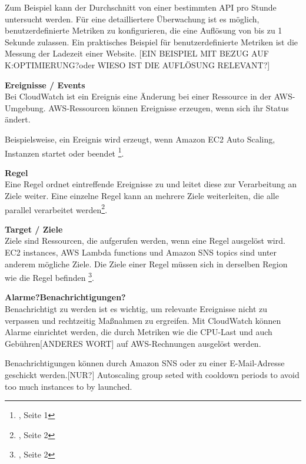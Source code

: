 Zum Beispiel kann der Durchschnitt von einer bestimmten API pro Stunde untersucht werden.
Für eine detailliertere Überwachung ist es möglich, benutzerdefinierte Metriken zu konfigurieren, die eine Auflösung von bis zu 1 Sekunde zulassen. Ein praktisches Beispiel für benutzerdefinierte Metriken ist die Messung der Ladezeit einer Website.
      [EIN BEISPIEL MIT BEZUG AUF K:OPTIMIERUNG?oder WIESO IST DIE AUFLÖSUNG RELEVANT?]

\textbf{Ereignisse / Events} \\
Bei CloudWatch ist ein Ereignis eine Änderung bei einer Ressource in der AWS-Umgebung.
AWS-Ressourcen können Ereignisse erzeugen, wenn sich ihr Status ändert.

Beispielsweise, ein Ereignis wird erzeugt, wenn Amazon EC2 Auto Scaling, Instanzen startet oder beendet \footnote{\cite{AMZ13}, Seite 1}.

\textbf{Regel} \\
Eine Regel ordnet eintreffende Ereignisse zu und leitet diese zur Verarbeitung an Ziele weiter.
Eine einzelne Regel kann an mehrere Ziele weiterleiten, die alle parallel verarbeitet werden\footnote{\cite{AMZ13}, Seite 2}.

\textbf{Target / Ziele} \\
Ziele sind Ressourcen, die aufgerufen werden, wenn eine Regel ausgelöst wird.
EC2 instances, AWS Lambda functions und Amazon SNS topics sind unter anderem mögliche Ziele.
Die Ziele einer Regel müssen sich in derselben Region wie die Regel befinden
\footnote{\cite{AMZ13}, Seite 2}.

\textbf{Alarme?Benachrichtigungen?}\\
Benachrichtigt zu werden ist es wichtig, um relevante Ereignisse nicht zu verpassen und rechtzeitig Maßnahmen zu ergreifen. Mit CloudWatch können Alarme einrichtet werden, die durch Metriken wie die CPU-Last und auch Gebühren[ANDERES WORT] auf AWS-Rechnungen ausgelöst werden.

Benachrichtigungen können durch Amazon SNS oder zu einer E-Mail-Adresse geschickt werden.[NUR?]
Autoscaling group seted with cooldown periods to avoid too much instances to by launched.

